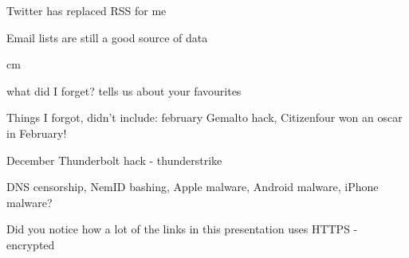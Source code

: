 \documentclass[20pt,landscape,a4paper,footrule]{foils}
\begin{document}
{\small{}}





\begin{list1}
\item Twitter has replaced RSS for me
\item Email lists are still a good source of data
\end{list1}




 cm

\centerline{\Large what did I forget? tells us about your favourites \smiley}

Things I forgot, didn't include: february Gemalto hack, Citizenfour won an oscar in February! 

December Thunderbolt hack - thunderstrike



DNS censorship, NemID bashing, Apple malware, Android malware, iPhone malware?

Did you notice how a lot of the links in this presentation uses HTTPS - encrypted

\myquestionspage
\end{document}
